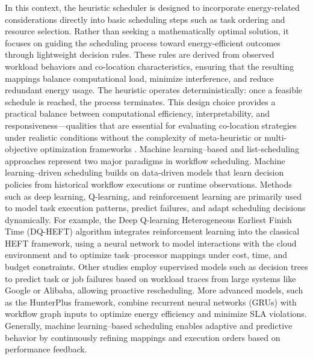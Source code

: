 In this context, the heuristic scheduler is designed to incorporate energy-related considerations directly into basic scheduling steps such as task ordering and resource selection. Rather than seeking a mathematically optimal solution, it focuses on guiding the scheduling process toward energy-efficient outcomes through lightweight decision rules. These rules are derived from observed workload behaviors and co-location characteristics, ensuring that the resulting mappings balance computational load, minimize interference, and reduce redundant energy usage. The heuristic operates deterministically: once a feasible schedule is reached, the process terminates. This design choice provides a practical balance between computational efficiency, interpretability, and responsiveness—qualities that are essential for evaluating co-location strategies under realistic conditions without the complexity of meta-heuristic or multi-objective optimization frameworks \cite{HosseiniShirvani2024}.
Machine learning–based and list-scheduling approaches represent two major paradigms in workflow scheduling. Machine learning–driven scheduling builds on data-driven models that learn decision policies from historical workflow executions or runtime observations. Methods such as deep learning, Q-learning, and reinforcement learning are primarily used to model task execution patterns, predict failures, and adapt scheduling decisions dynamically. For example, the Deep Q-learning Heterogeneous Earliest Finish Time (DQ-HEFT) algorithm integrates reinforcement learning into the classical HEFT framework, using a neural network to model interactions with the cloud environment and to optimize task–processor mappings under cost, time, and budget constraints. Other studies employ supervised models such as decision trees to predict task or job failures based on workload traces from large systems like Google or Alibaba, allowing proactive rescheduling. More advanced models, such as the HunterPlus framework, combine recurrent neural networks (GRUs) with workflow graph inputs to optimize energy efficiency and minimize SLA violations. Generally, machine learning–based scheduling enables adaptive and predictive behavior by continuously refining mappings and execution orders based on performance feedback.

